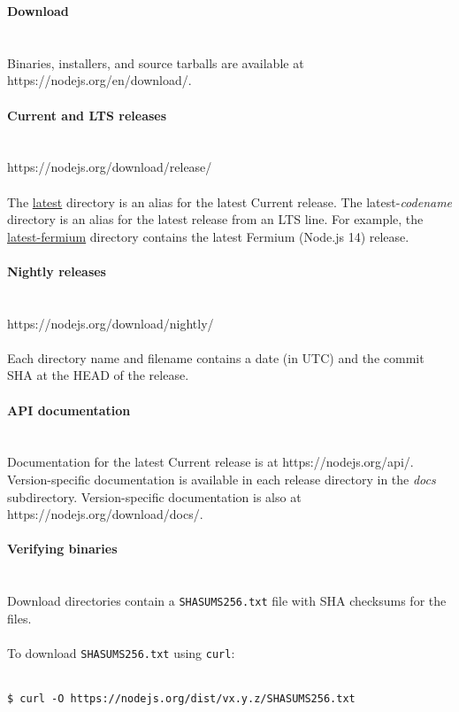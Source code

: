 \documentclass{article}
\begin{document}
{\noindent \LARGE \textbf{Download}}\\\\
\\
Binaries, installers, and source tarballs are available at https://nodejs.org/en/download/.\\
\\
{\noindent \Large \textbf{Current and LTS releases}}\\\\
\\
https://nodejs.org/download/release/\\
\\
The \href{https://nodejs.org/download/release/latest/}{latest} directory is an alias for the latest Current release. The latest-\textit{codename} directory is an alias for the latest release from an LTS line. For example, the \href{https://nodejs.org/download/release/latest-fermium/}{latest-fermium} directory contains the latest Fermium (Node.js 14) release.\\
\\
{\noindent \Large \textbf{Nightly releases}}\\\\
\\
https://nodejs.org/download/nightly/\\
\\
Each directory name and filename contains a date (in UTC) and the commit SHA at the HEAD of the release.\\
\\
{\noindent \Large \textbf{API documentation}}\\\\
\\
Documentation for the latest Current release is at https://nodejs.org/api/. Version-specific documentation is available in each release directory in the \textit{docs} subdirectory. Version-specific documentation is also at https://nodejs.org/download/docs/.\\
\\
{\noindent \LARGE \textbf{Verifying binaries}}\\\\
\\
Download directories contain a \verb|SHASUMS256.txt| file with SHA checksums for the files.\\
\\
To download \verb|SHASUMS256.txt| using \verb|curl|:\\
\\
\begin{lstlisting}
$ curl -O https://nodejs.org/dist/vx.y.z/SHASUMS256.txt
\end{lstlisting}
\end{document}

